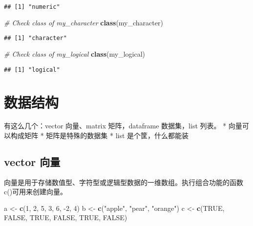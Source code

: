 \documentclass[]{book}
\newenvironment{Shaded}{\begin{snugshade}}{\end{snugshade}}
\newcommand{\CommentTok}[1]{\textcolor[rgb]{0.56,0.35,0.01}{\textit{#1}}}
\newcommand{\DecValTok}[1]{\textcolor[rgb]{0.00,0.00,0.81}{#1}}
\newcommand{\KeywordTok}[1]{\textcolor[rgb]{0.13,0.29,0.53}{\textbf{#1}}}
\newcommand{\NormalTok}[1]{#1}
\newcommand{\OtherTok}[1]{\textcolor[rgb]{0.56,0.35,0.01}{#1}}
\newcommand{\StringTok}[1]{\textcolor[rgb]{0.31,0.60,0.02}{#1}}
\begin{document}
\begin{verbatim}
## [1] "numeric"
\end{verbatim}

\begin{Shaded}
\begin{Highlighting}[]
\CommentTok{# Check class of my_character}
\KeywordTok{class}\NormalTok{(my_character)}
\end{Highlighting}
\end{Shaded}

\begin{verbatim}
## [1] "character"
\end{verbatim}

\begin{Shaded}
\begin{Highlighting}[]
\CommentTok{# Check class of my_logical}
\KeywordTok{class}\NormalTok{(my_logical)}
\end{Highlighting}
\end{Shaded}

\begin{verbatim}
## [1] "logical"
\end{verbatim}

\section{数据结构}

有这么几个：vector 向量、matrix 矩阵，dataframe 数据集，list 列表。 *
向量可以构成矩阵 * 矩阵是特殊的数据集 * list 是个筐，什么都能装

\hypertarget{vector-}{%
\subsection{vector 向量}\label{vector-}}

向量是用于存储数值型、字符型或逻辑型数据的一维数组。执行组合功能的函数c()可用来创建向量。

\begin{Shaded}
\begin{Highlighting}[]
\NormalTok{a <-}\StringTok{ }\KeywordTok{c}\NormalTok{(}\DecValTok{1}\NormalTok{, }\DecValTok{2}\NormalTok{, }\DecValTok{5}\NormalTok{, }\DecValTok{3}\NormalTok{, }\DecValTok{6}\NormalTok{, }\DecValTok{-2}\NormalTok{, }\DecValTok{4}\NormalTok{)}
\NormalTok{b <-}\StringTok{ }\KeywordTok{c}\NormalTok{(}\StringTok{"apple"}\NormalTok{, }\StringTok{"pear"}\NormalTok{, }\StringTok{"orange"}\NormalTok{)}
\NormalTok{c <-}\StringTok{ }\KeywordTok{c}\NormalTok{(}\OtherTok{TRUE}\NormalTok{, }\OtherTok{FALSE}\NormalTok{, }\OtherTok{TRUE}\NormalTok{, }\OtherTok{FALSE}\NormalTok{, }\OtherTok{TRUE}\NormalTok{, }\OtherTok{FALSE}\NormalTok{)}
\end{Highlighting}
\end{Shaded}
\end{document}
